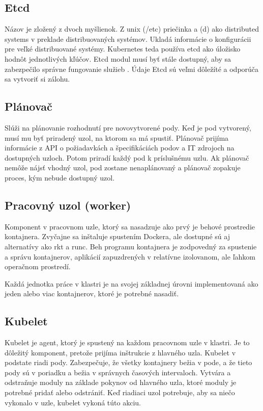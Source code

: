 \subsection*{Etcd}
Názov je zložený z dvoch myšlienok. Z unix (/etc) priečinka a (d) ako distributed systems v preklade distribuovaných systémov. Ukladá informácie o konfigurácii pre veľké distribuované systémy. Kubernetes teda používa etcd ako úložisko hodnôt jednotlivých kľúčov. Etcd modul musí byť stále dostupný, aby sa zabezpečilo správne fungovanie služieb \cite{etcd}. Údaje Etcd sú veľmi dôležíté a odporúča sa vytvoriť si zálohu.

\subsection*{Plánovač}
Slúži na plánovanie rozhodnutí pre novovytvorené pody. Keď je pod vytvorený, musí mu byť priradený uzol, na ktorom sa má spustiť. Plánovač prijíma informácie z API o požiadavkách a špecifikáciách podov a IT zdrojoch na dostupných uzloch. Potom priradí každý pod k príslušnému uzlu. Ak plánovač nemôže nájsť vhodný uzol, pod zostane nenaplánovaný a plánovač zopakuje proces, kým nebude dostupný uzol.

\subsection{Pracovný uzol (worker)}

Komponent v pracovnom uzle, ktorý sa nasadzuje ako prvý je behové prostredie kontajnera. Zvyčajne sa inštaluje spustením Dockera, ale dostupné sú aj alternatívy ako rkt a runc. Beh programu kontajnera je zodpovedný za spustenie a správu kontajnerov, aplikácií zapuzdrených v relatívne izolovanom, ale ľahkom operačnom prostredí.

Každá jednotka práce v klastri je na svojej základnej úrovni implementovaná ako jeden alebo viac kontajnerov, ktoré je potrebné nasadiť.

\subsection*{Kubelet}
Kubelet je agent, ktorý je spustený na každom pracovnom uzle v klastri. Je to dôležitý komponent, pretože prijíma inštrukcie z hlavného uzla. Kubelet v podstate riadi pody. Zabezpečuje, že všetky kontajnery bežia v pode, a že tieto pody sú v poriadku a bežia v správnych časových intervaloch. Vytvára a odstraňuje moduly na základe pokynov od hlavného uzla, ktoré moduly je potrebné pridať alebo odstrániť. Keď riadiaci uzol potrebuje, aby sa niečo vykonalo v uzle, kubelet vykoná túto akciu.

